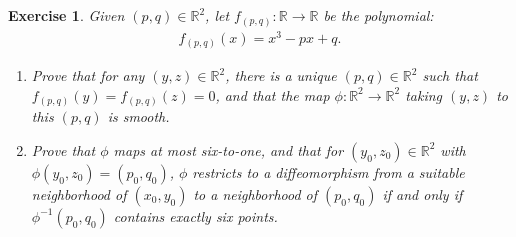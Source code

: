 \documentclass[11pt]{article}
\newtheorem{exercise}{Exercise}[section]
\theoremstyle{definition}
\numberwithin{equation}{subsection}
\begin{document}
\medskip

\begin{exercise}
Given $(p, q) \in \mathbb{R}^2$, let $f_{(p, q)}: \mathbb{R} \to \mathbb{R}$ be the polynomial:
\begin{align*}
    f_{(p, q)}(x) = x^3 - px + q.
\end{align*}
\begin{enumerate}[label=(\alph*)]
    \item Prove that for any $(y,z) \in \mathbb{R}^2$, there is a unique $(p, q) \in \mathbb{R}^2$ such that $f_{(p, q)}(y) = f_{(p, q)}(z) = 0$, and that the map $\phi: \mathbb{R}^2 \to \mathbb{R}^2$ taking $(y, z)$ to this $(p, q)$ is smooth.
    
    \item{\rm *} Prove that $\phi$ maps at most six-to-one, and that for $(y_0, z_0) \in \mathbb{R}^2$ with $\phi(y_0, z_0) = (p_0, q_0)$, $\phi$ restricts to a diffeomorphism from a suitable neighborhood of $(x_0, y_0)$ to a neighborhood of $(p_0, q_0)$ if and only if $\phi^{-1}(p_0, q_0)$ contains exactly six points.
\end{enumerate}
\end{exercise}
\end{document}
